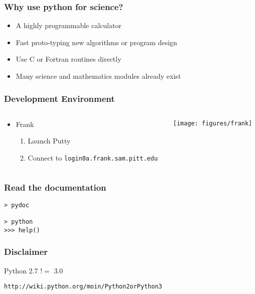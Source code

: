 \documentclass[xcolor=table,10pt,final]{beamer}
\begin{document}
\begin{frame}
  \frametitle{Why use python for science?}
  \begin{itemize}
    \item A highly programmable calculator
    \item Fast proto-typing new algorithms or program design
    \item Use C or Fortran routines directly
    \item Many science and mathematics modules already exist
  \end{itemize}
\end{frame}

\begin{frame}[fragile]
  \frametitle{Development Environment}
  \begin{columns}
    \begin{column}{0.5\paperwidth}
      \begin{itemize}
        \item Frank
          \begin{enumerate}
            \item Launch Putty
            \item Connect to {\tt login0a.frank.sam.pitt.edu}
          \end{enumerate}
      \end{itemize}
    \end{column}
    \begin{column}{0.5\paperwidth}
      \centering
      \texttt{[image: figures/frank]}
    \end{column}
  \end{columns}
\end{frame}

\begin{frame}[fragile]
  \frametitle{Read the documentation}
  \begin{verbatim}
> pydoc

> python
>>> help()
\end{verbatim}
\end{frame}

\begin{frame}[fragile]
  \frametitle{Disclaimer}
  Python 2.7 $!=$ 3.0
  \vskip1cm
  \begin{verbatim}
http://wiki.python.org/moin/Python2orPython3
\end{verbatim}
\end{frame}
\end{document}
